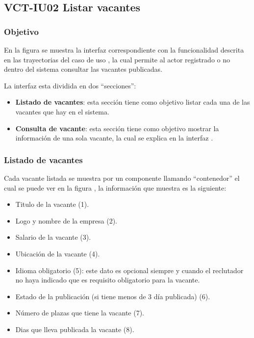 \clearpage
\subsection{VCT-IU02 Listar vacantes}

\subsubsection{Objetivo}
En la figura  se muestra la interfaz correspondiente con la funcionalidad descrita en las
trayectorias del caso de uso  , la cual permite al actor registrado o no dentro del sistema consultar 
las vacantes publicadas.

La interfaz  esta dividida en dos ``secciones'':
\begin{itemize}
   \item \textbf{Listado de vacantes}: esta sección tiene como objetivo listar cada una de las vacantes que hay en el sistema.
   \item \textbf{Consulta de vacante}: esta sección tiene como objetivo mostrar la información de una sola vacante, la cual se explica en 
   la interfaz .
\end{itemize}
\subsubsection{Listado de vacantes}
Cada vacante listada se muestra por un componente llamando ``contenedor'' el cual se puede ver en la figura , la información que 
muestra es la siguiente: 
\begin{itemize}
   \item Titulo de la vacante (1).
   \item Logo y nombre de la empresa (2).
   \item Salario de la vacante (3).
   \item Ubicación de la vacante (4).
   \item Idioma obligatorio (5): este dato es opcional siempre y cuando el reclutador no haya indicado que es requisito obligatorio 
   para la vacante.
   \item Estado de la publicación (si tiene menos de 3 día publicada) (6).
   \item Número de plazas que tiene la vacante (7).
   \item Dias que lleva publicada la vacante (8).
\end{itemize}

